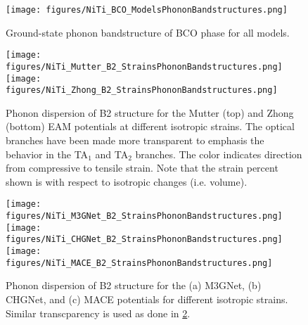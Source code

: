 \documentclass[preprint]{elsarticle}
\begin{document}
\begin{figure}[ht!]
    \begin{centering}
        \texttt{[image: figures/NiTi\_BCO\_ModelsPhononBandstructures.png]}
        \caption{
          Ground-state phonon bandstructure of BCO phase for all models.
        }
        \label{fig:allmodels_B19P}
    \end{centering}
\end{figure}

\begin{figure}[ht!]
    \begin{centering}
        \texttt{[image: figures/NiTi\_Mutter\_B2\_StrainsPhononBandstructures.png]}
        \vspace{1mm}
        \texttt{[image: figures/NiTi\_Zhong\_B2\_StrainsPhononBandstructures.png]}
        \caption{
           Phonon dispersion of B2 structure for the Mutter (top) and Zhong (bottom)  EAM potentials at different isotropic strains. The optical branches have been made more transparent to emphasis the behavior in the TA$_1$ and TA$_2$ branches. The color indicates direction from compressive to tensile strain. Note that the strain percent shown is with respect to isotropic changes (i.e. volume). 
        }
        \label{fig:mutter_zhong_phonon_b2}
    \end{centering}
\end{figure}



\begin{figure}[ht!]
    \begin{centering}
      \texttt{[image: figures/NiTi\_M3GNet\_B2\_StrainsPhononBandstructures.png]}
      \vspace{1mm}
      \texttt{[image: figures/NiTi\_CHGNet\_B2\_StrainsPhononBandstructures.png]}
      \vspace{1mm}
      \texttt{[image: figures/NiTi\_MACE\_B2\_StrainsPhononBandstructures.png]}
      \caption{
        Phonon dispersion of B2 structure for the (a) M3GNet, (b) CHGNet, and (c) MACE potentials for different isotropic strains. Similar transcparency is used as done in \ref{fig:mutter_zhong_phonon_b2}.
      }
      \label{fig:gnn_phonon_b2}
    \end{centering}
\end{figure}
\end{document}
